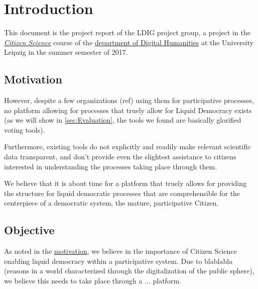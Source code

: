 \chapter{Introduction}
\label{ch:Introduction}


This document is the project report of the LDIG project group, a project in the \href{http://www.dh.uni-leipzig.de/wo/courses/summer-semester-20142015/citizen-science/}{\textit{Citizen Science}} course of the \href{http://www.dh.uni-leipzig.de/wo/}{department of Digital Humanities} at the University Leipzig in the summer semester of 2017.

\section{Motivation}
\label{sec:Motivation}



However, despite a few organizations (ref) using them for participative processes, no platform allowing for processes that truely allow for Liquid Democracy exists (as we will show in \ref{sec:Evaluation}, the tools we found are basically glorified voting tools). 

Furthermore, existing tools do not explicitly and readily make relevant scientific data transparent, and don't provide even the slightest assistance to citizens interested in understanding the processes taking place through them. 

We believe that it is about time for a platform that truely allows for providing the structure for liquid democratic processes that are comprehensible for the centrepiece of a democratic system, the mature, participative Citizen.


\section{Objective}
\label{sec:Objective}

As noted in the \href{ssec:Motivation}{motivation}, we believe in the importance of Citizen Science enabling liquid democracy within a participative system. Due to blablabla (reasons in a world characterized through the digitalization of the public sphere), we believe this needs to take place through a ... platform. 

